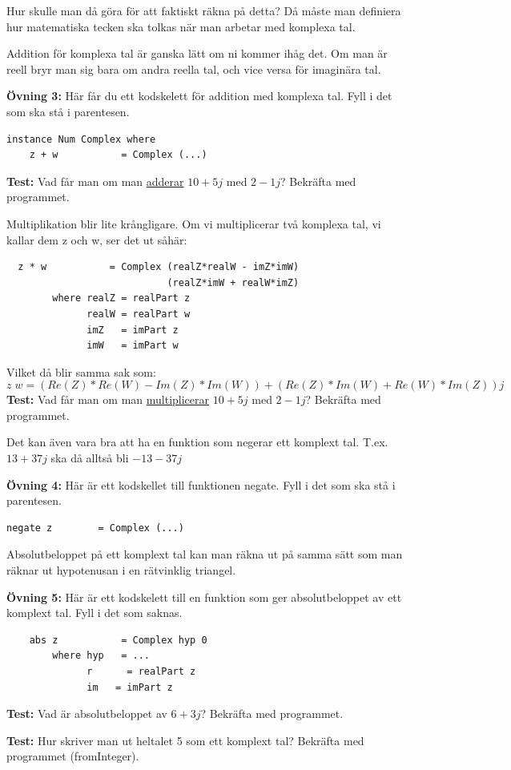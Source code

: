 \documentclass{article}
\begin{document}
Hur skulle man då göra för att faktiskt räkna på detta?
Då måste man definiera hur matematiska tecken ska tolkas när man arbetar med
komplexa tal.

Addition för komplexa tal är ganska lätt om ni kommer ihåg det.
Om man är reell bryr man sig bara om andra reella tal, och vice versa för
imaginära tal.

\textbf{Övning 3:} Här får du ett kodskelett för addition med komplexa tal.
Fyll i det som ska stå i parentesen.
\begin{verbatim}
instance Num Complex where
    z + w           = Complex (...)
\end{verbatim}
\textbf{Test:} Vad får man om man \underline{adderar} $10 + 5j$ med $2 -1j$?
Bekräfta med programmet.

Multiplikation blir lite krångligare.
Om vi multiplicerar två komplexa tal, vi kallar dem z och w, ser det ut såhär:
\begin{verbatim}
  z * w           = Complex (realZ*realW - imZ*imW)
                            (realZ*imW + realW*imZ)
        where realZ = realPart z
              realW = realPart w
              imZ   = imPart z
              imW   = imPart w
\end{verbatim}
Vilket då blir samma sak som:
$$z \; w = (Re(Z) * Re(W) - Im(Z)*Im(W)) + (Re(Z)*Im(W) + Re(W)*Im(Z))j$$
\textbf{Test:} Vad får man om man \underline{multiplicerar} $10 + 5j$ med $2 -1j$?
Bekräfta med programmet.

Det kan även vara bra att ha en funktion som negerar ett komplext tal.
T.ex. $13+37j$ ska då alltså bli $-13-37j$

\textbf{Övning 4:} Här är ett kodskellet till funktionen negate.
Fyll i det som ska stå i parentesen.
\begin{verbatim}
negate z        = Complex (...)
\end{verbatim}
Absolutbeloppet på ett komplext tal kan man räkna ut på samma sätt som man
räknar ut hypotenusan i en rätvinklig triangel.

\textbf{Övning 5:} Här är ett kodskelett till en funktion som ger absolutbeloppet
av ett komplext tal. Fyll i det som saknas.
\begin{verbatim}
    abs z           = Complex hyp 0
        where hyp   = ...
              r      = realPart z
              im   = imPart z
\end{verbatim}
\textbf{Test:} Vad är absolutbeloppet av $6 + 3j$? Bekräfta med programmet.

\textbf{Test:} Hur skriver man ut heltalet 5 som ett komplext tal?
Bekräfta med programmet (fromInteger).
\end{document}

